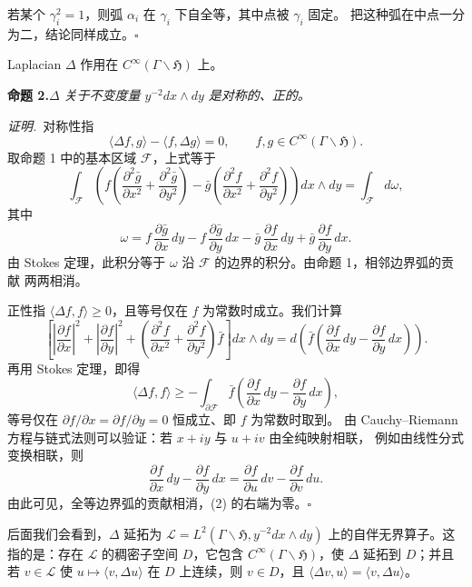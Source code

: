 若某个 $\gamma_{i}^{2}=1$，则弧 $\alpha_{i}$ 在 $\gamma_{i}$ 下自全等，其中点被 $\gamma_{i}$ 固定。
把这种弧在中点一分为二，结论同样成立。\hfill$\square$

\medskip
Laplacian $\Delta$ 作用在 $C^{\infty}(\Gamma\backslash\mathfrak{H})$ 上。

\par\medskip\noindent\textbf{命题 2.}\quad\emph{$\Delta$ 关于不变度量 $y^{-2}dx\wedge dy$
是对称的、正的。}

\smallskip
\noindent\emph{证明.}\ 对称性指
\[
\langle\Delta f,g\rangle-\langle f,\Delta g\rangle=0,\qquad f,g\in C^{\infty}(\Gamma\backslash\mathfrak{H}).
\]
取命题 1 中的基本区域 $\mathcal{F}$，上式等于
\[
\int_{\mathcal{F}}\left(f\left(\frac{\partial^{2}\bar g}{\partial x^{2}}+\frac{\partial^{2}\bar g}{\partial y^{2}}\right)
-\bar g\left(\frac{\partial^{2}f}{\partial x^{2}}+\frac{\partial^{2}f}{\partial y^{2}}\right)\right)dx\wedge dy
=\int_{\mathcal{F}}d\omega,
\]
其中
\[
\omega=f\,\frac{\partial\bar g}{\partial x}\,dy-f\,\frac{\partial\bar g}{\partial y}\,dx
-\bar g\,\frac{\partial f}{\partial x}\,dy+\bar g\,\frac{\partial f}{\partial y}\,dx.
\]
由 Stokes 定理，此积分等于 $\omega$ 沿 $\mathcal{F}$ 的边界的积分。由命题 1，相邻边界弧的贡献
两两相消。

正性指 $\langle\Delta f,f\rangle\ge0$，且等号仅在 $f$ 为常数时成立。我们计算
\[
\left[\left|\frac{\partial f}{\partial x}\right|^{2}+\left|\frac{\partial f}{\partial y}\right|^{2}
+\left(\frac{\partial^{2}f}{\partial x^{2}}+\frac{\partial^{2}f}{\partial y^{2}}\right)\bar f\right]dx\wedge dy
=d\left(\bar f\left(\frac{\partial f}{\partial x}\,dy-\frac{\partial f}{\partial y}\,dx\right)\right).
\]
再用 Stokes 定理，即得
\begin{equation}\tag{2}
\langle\Delta f,f\rangle\ge-\int_{\partial\mathcal{F}}\bar f\left(\frac{\partial f}{\partial x}\,dy-\frac{\partial f}{\partial y}\,dx\right),
\end{equation}
等号仅在 $\partial f/\partial x=\partial f/\partial y=0$ 恒成立、即 $f$ 为常数时取到。
由 Cauchy--Riemann 方程与链式法则可以验证：若 $x+iy$ 与 $u+iv$ 由全纯映射相联，
例如由线性分式变换相联，则
\[
\frac{\partial f}{\partial x}\,dy-\frac{\partial f}{\partial y}\,dx
=\frac{\partial f}{\partial u}\,dv-\frac{\partial f}{\partial v}\,du.
\]
由此可见，全等边界弧的贡献相消，(2) 的右端为零。\hfill$\square$

后面我们会看到，$\Delta$ 延拓为 $\mathcal{L}=L^{2}(\Gamma\backslash\mathfrak{H},y^{-2}dx\wedge dy)$
上的自伴无界算子。这指的是：存在 $\mathcal{L}$ 的稠密子空间 $D$，它包含
$C^{\infty}(\Gamma\backslash\mathfrak{H})$，使 $\Delta$ 延拓到 $D$；并且若 $v\in\mathcal{L}$ 使
$u\mapsto\langle v,\Delta u\rangle$ 在 $D$ 上连续，则 $v\in D$，且
$\langle\Delta v,u\rangle=\langle v,\Delta u\rangle$。

